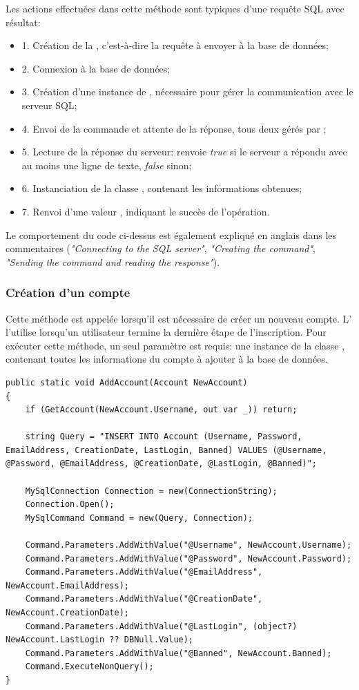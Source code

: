 \documentclass[12pt]{report}
\begin{document}
Les actions effectuées dans cette méthode sont typiques d’une requête SQL avec résultat:
\begin{itemize}
	\item 1. Création de la , c’est-à-dire la requête à envoyer à la base de données;
	\item 2. Connexion à la base de données;
	\item 3. Création d’une instance de , nécessaire pour gérer la communication avec le serveur SQL;
	\item 4. Envoi de la commande et attente de la réponse, tous deux gérés par ;
	\item 5. Lecture de la réponse du serveur:  renvoie \textit{true} si le serveur a répondu avec au moins une ligne de texte, \textit{false} sinon;
	\item 6. Instanciation de la classe , contenant les informations obtenues;
	\item 7. Renvoi d’une valeur , indiquant le succès de l’opération.
\end{itemize}
Le comportement du code ci-dessus est également expliqué en anglais dans les commentaires (\textit{"Connecting to the SQL server"}, \textit{"Creating the command"}, \textit{"Sending the command and reading the response"}).

\subsubsection{Création d’un compte}

Cette méthode est appelée lorsqu’il est nécessaire de créer un nouveau compte. L’ l’utilise lorsqu’un utilisateur termine la dernière étape de l’inscription. Pour exécuter cette méthode, un seul paramètre est requis: une instance de la classe , contenant toutes les informations du compte à ajouter à la base de données.

\begin{verbatim}
public static void AddAccount(Account NewAccount)
{
	if (GetAccount(NewAccount.Username, out var _)) return;
	
	string Query = "INSERT INTO Account (Username, Password, EmailAddress, CreationDate, LastLogin, Banned) VALUES (@Username, @Password, @EmailAddress, @CreationDate, @LastLogin, @Banned)";
	
	MySqlConnection Connection = new(ConnectionString);
	Connection.Open();
	MySqlCommand Command = new(Query, Connection);
	
	Command.Parameters.AddWithValue("@Username", NewAccount.Username);
	Command.Parameters.AddWithValue("@Password", NewAccount.Password);
	Command.Parameters.AddWithValue("@EmailAddress", NewAccount.EmailAddress);
	Command.Parameters.AddWithValue("@CreationDate", NewAccount.CreationDate);
	Command.Parameters.AddWithValue("@LastLogin", (object?) NewAccount.LastLogin ?? DBNull.Value);
	Command.Parameters.AddWithValue("@Banned", NewAccount.Banned);
	Command.ExecuteNonQuery();
}
\end{verbatim}
\end{document}
